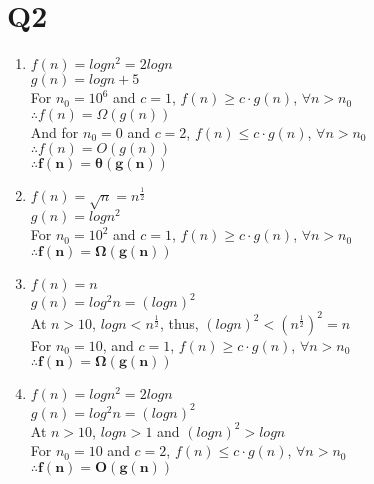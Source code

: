 \documentclass[12pt,a4paper]{article}
\begin{document}
    \section{Q2}
    \begin{enumerate}[label=(\arabic*)]
        \item
            $f(n)=logn^2=2logn$\\
            $g(n)=logn+5$\\
            For $n_0=10^6$ and $c=1$, $f(n)\geq  c\cdot g(n)$, $\forall n>n_0$\\
            $\therefore f(n)=\Omega(g(n))$\\
            And for $n_0=0$ and $c=2$, $f(n)\leq  c\cdot g(n)$, $\forall n>n_0$\\
            $\therefore f(n)=O(g(n))$\\
            $\mathbf{\therefore f(n)=\theta(g(n))}$

        \item
            $f(n)=\sqrt{n}=n^\frac{1}{2}$\\
            $g(n)=log n^2$\\
            For $n_0=10^2$ and $c=1$, $f(n)\geq  c\cdot g(n)$, $\forall n>n_0$\\
            $\mathbf{\therefore f(n)=\Omega(g(n))}$

        \item
            $f(n)=n$\\
            $g(n)=log^2 n=(logn)^2$\\
            At $n>10$, $logn<n^\frac{1}{2}$, thus, $(logn)^2<(n^\frac{1}{2})^2=n$\\
            For $n_0=10$, and $c=1$, $f(n)\geq  c\cdot g(n)$, $\forall n>n_0$\\
            $\mathbf{\therefore f(n)=\Omega(g(n))}$

        \item
            $f(n)=logn^2=2logn$\\
            $g(n)=log^2n=(logn)^2$\\
            At $n>10$, $logn>1$ and $(logn)^2>logn$\\
            For $n_0=10$ and $c=2$, $f(n)\leq  c\cdot g(n)$, $\forall n>n_0$\\
            $\mathbf{\therefore f(n)=O(g(n))}$
    \end{enumerate}

\end{document}
